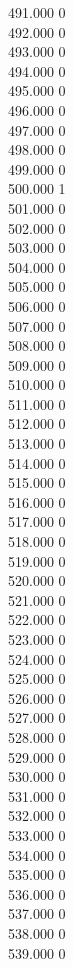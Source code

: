 { 491.000	0 \\
 492.000	0 \\
 493.000	0 \\
 494.000	0 \\
 495.000	0 \\
 496.000	0 \\
 497.000	0 \\
 498.000	0 \\
 499.000	0 \\
 500.000	1 \\
 501.000	0 \\
 502.000	0 \\
 503.000	0 \\
 504.000	0 \\
 505.000	0 \\
 506.000	0 \\
 507.000	0 \\
 508.000	0 \\
 509.000	0 \\
 510.000	0 \\
 511.000	0 \\
 512.000	0 \\
 513.000	0 \\
 514.000	0 \\
 515.000	0 \\
 516.000	0 \\
 517.000	0 \\
 518.000	0 \\
 519.000	0 \\
 520.000	0 \\
 521.000	0 \\
 522.000	0 \\
 523.000	0 \\
 524.000	0 \\
 525.000	0 \\
 526.000	0 \\
 527.000	0 \\
 528.000	0 \\
 529.000	0 \\
 530.000	0 \\
 531.000	0 \\
 532.000	0 \\
 533.000	0 \\
 534.000	0 \\
 535.000	0 \\
 536.000	0 \\
 537.000	0 \\
 538.000	0 \\
 539.000	0 \\
}
